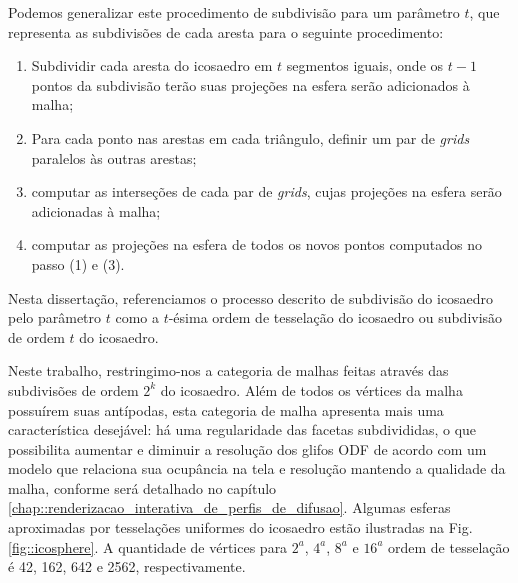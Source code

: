 \documentclass[
    12pt,                %
    oneside,            %
    a4paper,            %
    english,            %
    french,                %
    spanish,            %
    brazil                %
    ]{abntex2}
\begin{document}
Podemos generalizar este procedimento de subdivisão para um parâmetro $t$, que representa as subdivisões de cada aresta para o seguinte procedimento:

\begin{enumerate}
    \item Subdividir cada aresta do icosaedro em $t$ segmentos iguais, onde os $t-1$ pontos da subdivisão terão suas projeções na esfera serão adicionados à malha;
    \item Para cada ponto nas arestas em cada triângulo, definir um par de \textit{grids} paralelos às outras arestas;
    \item computar as interseções de cada par de \textit{grids}, cujas projeções na esfera serão adicionadas à malha;
    \item computar as projeções na esfera de todos os novos pontos computados no passo (1) e (3).
\end{enumerate}

Nesta dissertação, referenciamos o processo descrito de subdivisão do icosaedro pelo parâmetro $t$ como a \textsf{$t$-ésima ordem de tesselação do icosaedro} ou \textsf{subdivisão de ordem $t$ do icosaedro}.

Neste trabalho, restringimo-nos a categoria de malhas feitas através das subdivisões de ordem $2^k$ do icosaedro. Além de todos os vértices da malha possuírem suas antípodas, esta categoria de malha apresenta mais uma característica desejável: há uma regularidade das facetas subdivididas, o que possibilita aumentar e diminuir a resolução dos glifos ODF de acordo com um modelo que relaciona sua ocupância na tela e resolução mantendo a qualidade da malha, conforme será detalhado no capítulo \ref{chap::renderizacao_interativa_de_perfis_de_difusao}. Algumas esferas aproximadas por tesselações uniformes do icosaedro estão ilustradas na Fig. \ref{fig::icosphere}. A quantidade de vértices para $2^a$, $4^a$, $8^a$ e $16^a$ ordem de tesselação é 42, 162, 642 e 2562, respectivamente.
\end{document}
